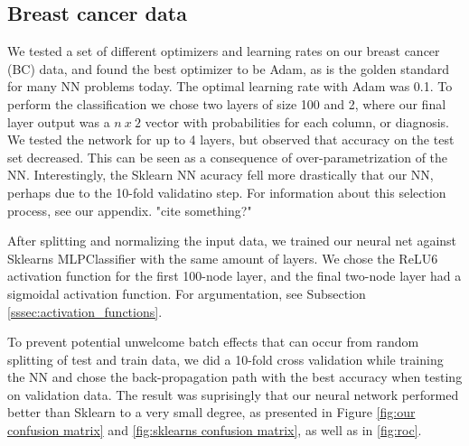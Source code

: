 \subsection{Breast cancer data}
We tested a set of different optimizers and learning rates on our breast cancer (BC) data, and found the best optimizer to be Adam, as is the golden standard for many NN problems today. The optimal learning rate with Adam was 0.1. To perform the classification we chose two layers of size 100 and 2, where our final layer output was a $n\ x\ 2$ vector with probabilities for each column, or diagnosis. We tested the network for up to 4 layers, but observed that accuracy on the test set decreased. This can be seen as a consequence of over-parametrization of the NN. Interestingly, the Sklearn NN acuracy fell more drastically that our NN, perhaps due to the 10-fold validatino step. For information about this selection process, see our appendix. "cite something?"

After splitting and normalizing the input data, we trained our neural net against Sklearns MLPClassifier with the same amount of layers. We chose the ReLU6 activation function for the first 100-node layer, and the final two-node layer had a sigmoidal activation function. For argumentation, see Subsection \ref{sssec:activation_functions}.

To prevent potential unwelcome batch effects that can occur from random splitting of test and train data, we did a 10-fold cross validation while training the NN and chose the back-propagation path with the best accuracy when testing on validation data. The result was suprisingly that our neural network performed better than Sklearn to a very small degree, as presented in Figure \ref{fig:our confusion matrix} and \ref{fig:sklearns confusion matrix}, as well as in \ref{fig:roc}.

